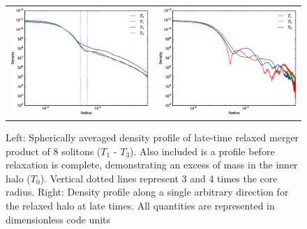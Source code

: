 \documentclass[a4paper,11pt]{article}
\begin{document}
\begin{figure}
\begin{tabular}{cc}
{\includegraphics[scale = 0.42, trim={1.5cm 0 0 1cm}]{pics/M_comb.eps}} &
{\includegraphics[scale = 0.42, trim={2.5cm 0 0 1cm}]{pics/M_singles.eps}}
\end{tabular}
\caption{Left: Spherically averaged density profile of late-time relaxed merger product of 8 solitons ($T_1$ - $T_3$). Also included is a profile before relaxation is complete, demonstrating an excess of mass in the inner halo ($T_0$). Vertical dotted lines represent 3 and 4 times the core radius. 
Right: Density profile along a single arbitrary direction for the relaxed halo at late times. All quantities are represented in dimensionless code units}\label{fig:pul}
\end{figure}
\end{document}
